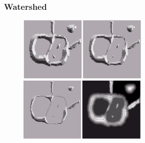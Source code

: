 \documentclass[notheorems,mathserif,table,compress]{beamer}  %
\begin{document}
\begin{frame}
  \frametitle{Watershed}
  \begin{figure}[!ht]
  \begin{minipage}[t]{0.6\textwidth}
  \centering
  \includegraphics[width=2.5in]{region4.png}
  \end{minipage}
  \begin{minipage}[t]{0.6\textwidth}
  \centering
  \includegraphics[width=2.5in]{region5.png}
  \end{minipage} 
  \end{figure}  
\end{frame}
\end{document}
